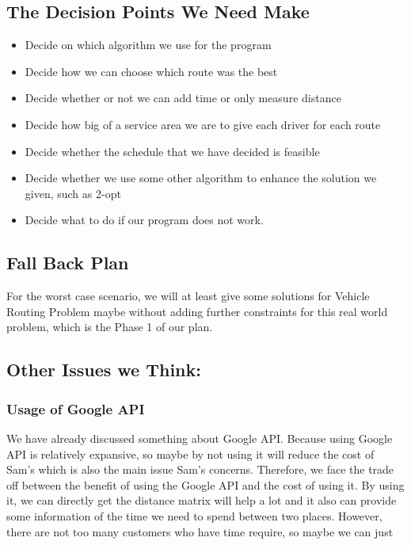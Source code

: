 \documentclass[11pt]{article}
\begin{document}
\subsection{The Decision Points We Need Make}
\begin{itemize}
    \item 	Decide on which algorithm we use for the program 
    \item	Decide how we can choose which route was the best
    \item	Decide whether or not we can add time or only measure distance 
    \item	Decide how big of a service area we are to give each driver for each route
    \item	Decide whether the schedule that we have decided is feasible
    \item   Decide whether we use some other algorithm to enhance the solution we given, such as 2-opt
    \item   Decide what to do if our program does not work.
\end{itemize}

\subsection{Fall Back Plan}
For the worst case scenario, we will at least give some solutions for Vehicle Routing Problem maybe without adding further constraints for this real world problem, which is the Phase 1 of our plan.

\subsection{Other Issues we Think:}
\subsubsection{Usage of Google API}
We have already discussed something about Google API. Because using Google API is relatively expansive, so maybe by not using it will reduce the cost of Sam's which is also the main issue Sam's concerns. Therefore, we face the trade off between the benefit of using the Google API and the cost of using it. By using it, we can directly get the distance matrix will help a lot and it also can provide some information of the time we need to spend between two places. However, there are not too many customers who have time require, so maybe we can just ignore the time part. In this case, because our algorithm will give a list of possible results, so we think the managers can just find one of them, which can fulfill the time require. Another thing we concern is that whether there is a student account or some free try of Google API for us to find out whether using it benefits our result or not.
\end{document}
